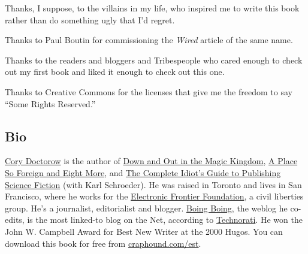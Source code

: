 Thanks, I suppose, to the villains in my life, who inspired me to
write this book rather than do something ugly that I’d regret.

Thanks to Paul Boutin for commissioning the \emph{Wired} article of
the same name.

Thanks to the readers and bloggers and Tribespeople who cared
enough to check out my first book and liked it enough to check out
this one.

Thanks to Creative Commons for the licenses that give me the
freedom to say “Some Rights Reserved.”

\subsection{Bio}

\href{http://craphound.com/}{Cory Doctorow} is the author of
\href{http://craphound.com/down}{Down and Out in the Magic Kingdom},
\href{http://craphound.com/place}{A Place So Foreign and Eight More},
and
\href{http://craphound.com/nonfic/cigpsf.html}{The Complete Idiot’s Guide to Publishing Science Fiction}
(with Karl Schroeder). He was raised in Toronto and lives in San
Francisco, where he works for the
\href{http://www.eff.org/}{Electronic Frontier Foundation}, a civil
liberties group. He’s a journalist, editorialist and blogger.
\href{http://boingboing.net/}{Boing Boing}, the weblog he co-edits,
is the most linked-to blog on the Net, according to
\href{http://technorati.com/}{Technorati}. He won the John W.
Campbell Award for Best New Writer at the 2000 Hugos. You can
download this book for free from
\href{http://craphound.com/est}{craphound.com/est}.

